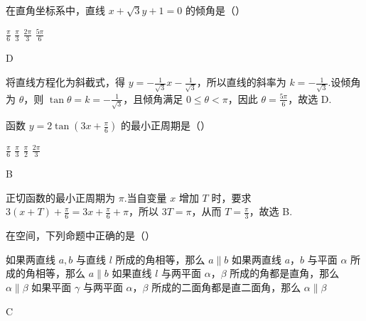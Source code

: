 \begin{problem}

在直角坐标系中，直线 \(x+\sqrt{3}y+1=0\) 的倾角是（\quad）

\choices
    {\(\frac{\pi}{6}\)}
    {\(\frac{\pi}{3}\)}
    {\(\frac{2\pi}{3}\)}
    {\(\frac{5\pi}{6}\)}
\end{problem}

\begin{answer}
D
\end{answer}

\begin{solution}
将直线方程化为斜截式，得
\(y=-\frac{1}{\sqrt{3}}x-\frac{1}{\sqrt{3}}\)，所以直线的斜率为
\(k=-\frac{1}{\sqrt{3}}\).设倾角为 \(\theta\)，则
\(\tan\theta=k=-\frac{1}{\sqrt{3}}\)，且倾角满足 \(0\leqslant\theta<\pi\)，因此
\(\theta=\frac{5\pi}{6}\)，故选 D.
\end{solution}

\begin{problem}

函数 \(y=2\tan\left( 3x+\frac{\pi}{6} \right)\) 的最小正周期是（\quad）

\choices
    {\(\frac{\pi}{6}\)}
    {\(\frac{\pi}{3}\)}
    {\(\frac{\pi}{2}\)}
    {\(\frac{2\pi}{3}\)}
\end{problem}

\begin{answer}
B
\end{answer}

\begin{solution}
正切函数的最小正周期为 \(\pi\).当自变量 \(x\) 增加 \(T\) 时，要求
\(3(x+T)+\frac{\pi}{6}=3x+\frac{\pi}{6}+\pi\)，所以 \(3T=\pi\)，从而
\(T=\frac{\pi}{3}\)，故选 B.
\end{solution}

\begin{problem}

在空间，下列命题中正确的是（\quad）

\choices
    {如果两直线 \(a,b\) 与直线 \(l\) 所成的角相等，那么 \(a\parallel b\)}
    {如果两直线 \(a\)，\(b\) 与平面 \(\alpha\) 所成的角相等，那么 \(a\parallel b\)}
    {如果直线 \(l\) 与两平面 \(\alpha\)，\(\beta\) 所成的角都是直角，那么 \(\alpha\parallel\beta\)}
    {如果平面 \(\gamma\) 与两平面 \(\alpha\)，\(\beta\) 所成的二面角都是直二面角，那么 \(\alpha\parallel\beta\)}
\end{problem}

\begin{answer}
C
\end{answer}

